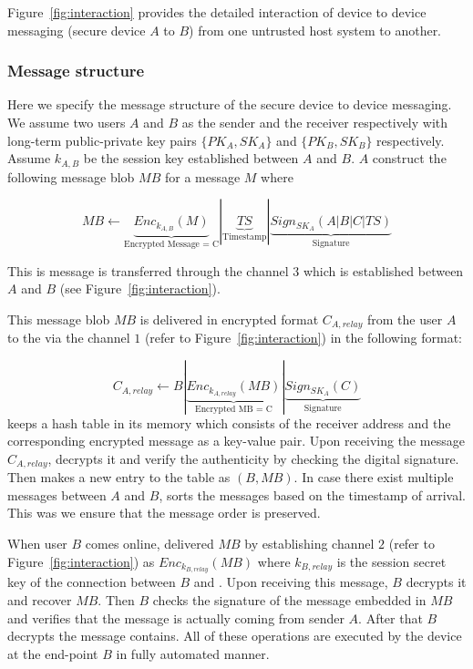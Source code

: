 Figure~\ref{fig:interaction} provides the detailed interaction of device to device messaging (secure \usb device $A$ to $B$) from one untrusted host system to another. 

\subsubsection{Message structure}

Here we specify the message structure of the secure device to device messaging. We assume two users $A$ and $B$ as the sender and the receiver respectively with long-term public-private key pairs $\{PK_A, SK_A\}$ and $\{PK_B, SK_B\}$ respectively. Assume $k_{A,B}$ be the session key established between $A$ and $B$. $A$ construct the following message blob $MB$ for a message $M$ where

\[
  MB \leftarrow 
    \underbrace{Enc_{k_{A, B}} (M)}_{\text{Encrypted Message = C}} | 
    \underbrace{TS}_\text{Timestamp} |
    \underbrace{Sign_{SK_A}(A| B| C | TS)}_\text{Signature}
\]

This is message is transferred through the \tls channel $3$ which is established between $A$ and $B$ (see Figure~\ref{fig:interaction}).

This message blob $MB$ is delivered in encrypted format $C_{A, relay}$ from the user $A$ to the \relay via the \tls channel $1$ (refer to Figure~\ref{fig:interaction}) in the following format:

\[
    C_{A, relay} \leftarrow
    B | 
    \underbrace{Enc_{k_{A, relay}} (MB)}_\text{Encrypted MB = C} |
    \underbrace{Sign_{SK_{A}}(C)}_\text{Signature}
\]
\relay keeps a hash table in its memory which consists of the receiver address and the corresponding encrypted message as a key-value pair. Upon receiving the message $C_{A, relay}$, \relay decrypts it and verify the authenticity by checking the digital signature. Then \relay makes a new entry to the table as $(B, MB)$. In case there exist multiple messages between $A$ and $B$, \relay sorts the messages based on the timestamp of arrival. This was we ensure that the message order is preserved.

When user $B$ comes online, \relay delivered $MB$ by establishing \tls channel $2$ (refer to Figure~\ref{fig:interaction}) as $Enc_{k_{B, relay}} (MB)$ where $k_{B, relay}$ is the session secret key of the \tls connection between $B$ and \relay. Upon receiving this message, $B$ decrypts it and recover $MB$. Then $B$ checks the signature of the message embedded in $MB$ and verifies that the message is actually coming from sender $A$. After that $B$ decrypts the message contains. All of these operations are executed by the \usb device at the end-point $B$ in fully automated manner. 

